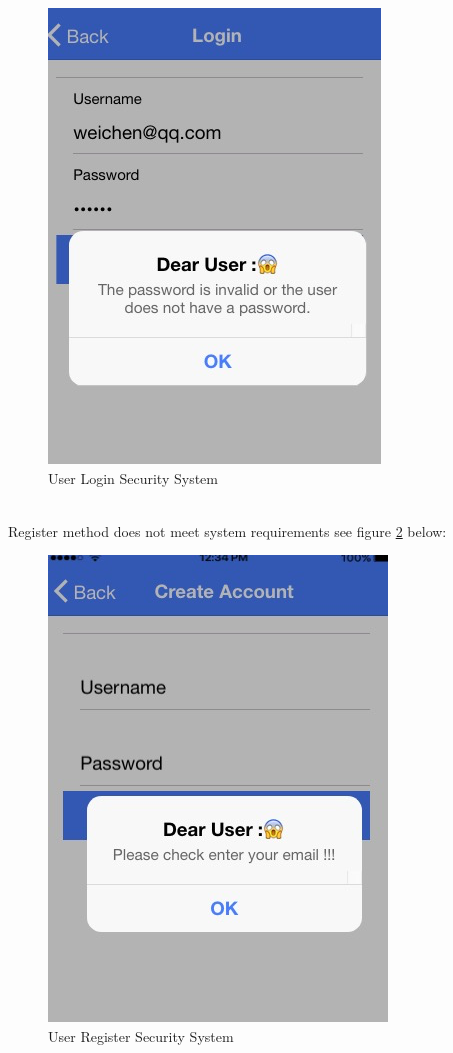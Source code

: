 \begin{figure}[h]
	\centering
	\includegraphics[scale=0.5]{img/Ionicalert3.png}
	\caption{User Login Security System}
	\label{fig:6.21 cubed graph}
\end{figure}
\\ Register method does not meet system requirements see figure \ref{fig:6.22 cubed graph} below:
\begin{figure}[h]
	\centering
	\includegraphics[scale=0.5]{img/Ionicalert4.png}
	\caption{User Register Security System}
	\label{fig:6.22 cubed graph}
\end{figure}
